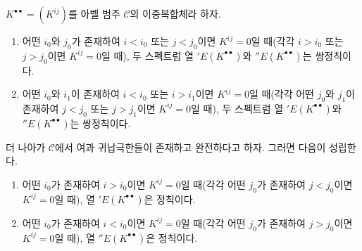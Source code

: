 \begin{proposition}[11.3.3]
\label{0.11.3.3-fr}
$K^{\bullet\bullet}=(K^{ij})$를 아벨 범주 $\mathcal C$의 이중복합체라
하자.
\begin{enumerate}
  \item[(i)] 어떤 $i_0$와 $j_0$가 존재하여 $i<i_0$ 또는 $j<j_0$이면
    $K^{ij}=0$일 때(각각 $i>i_0$ 또는 $j>j_0$이면 $K^{ij}=0$일 때), 두
    스펙트럼 열 $'E(K^{\bullet\bullet})$와
    $''E(K^{\bullet\bullet})$는 쌍정칙이다.
  \item[(ii)] 어떤 $i_0$와 $i_1$이 존재하여 $i<i_0$ 또는 $i>i_1$이면
    $K^{ij}=0$일 때(각각 어떤 $j_0$와 $j_1$이 존재하여 $j<j_0$ 또는
    $j>j_1$이면 $K^{ij}=0$일 때), 두 스펙트럼 열
    $'E(K^{\bullet\bullet})$와 $''E(K^{\bullet\bullet})$는 쌍정칙이다.
\end{enumerate}
더 나아가 $\mathcal C$에서 여과 귀납극한들이 존재하고 완전하다고 하자.
그러면 다음이 성립한다.
\begin{enumerate}
  \item[(iii)] 어떤 $i_0$가 존재하여 $i>i_0$이면 $K^{ij}=0$일
    때(각각 어떤 $j_0$가 존재하여 $j<j_0$이면 $K^{ij}=0$일 때), 열
    $'E(K^{\bullet\bullet})$은 정칙이다.
  \item[(iv)] 어떤 $i_0$가 존재하여 $i<i_0$이면 $K^{ij}=0$일
    때(각각 어떤 $j_0$가 존재하여 $j>j_0$이면 $K^{ij}=0$일 때), 열
    $''E(K^{\bullet\bullet})$은 정칙이다.
\end{enumerate}
\end{proposition}

